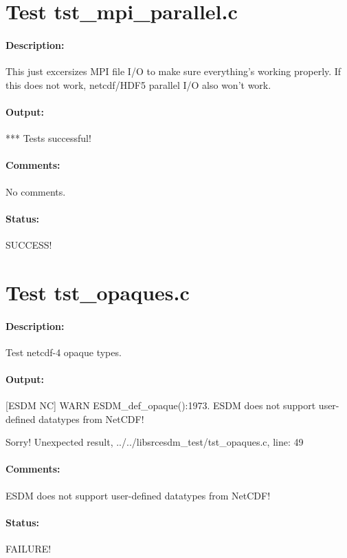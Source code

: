 \section{Test tst\_mpi\_parallel.c}

\paragraph{Description:} This just excersizes MPI file I/O to make sure everything's working properly. If this does not work, netcdf/HDF5 parallel I/O also won't work.

\paragraph{Output:} *** Tests successful!

\paragraph{Comments:} No comments.

\paragraph{Status:} SUCCESS!

\section{Test tst\_opaques.c}

\paragraph{Description:} Test netcdf-4 opaque types.

\paragraph{Output:} [ESDM NC] WARN ESDM\_def\_opaque():1973. ESDM does not support user-defined datatypes from NetCDF!

Sorry! Unexpected result, ../../libsrcesdm\_test/tst\_opaques.c, line: 49

\paragraph{Comments:} ESDM does not support user-defined datatypes from NetCDF!

\paragraph{Status:} FAILURE!

